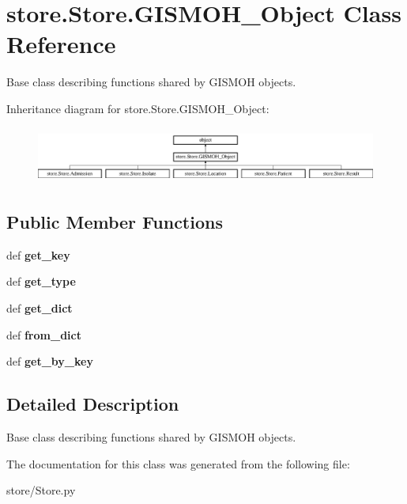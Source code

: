 \hypertarget{classstore_1_1_store_1_1_g_i_s_m_o_h___object}{\section{store.\-Store.\-G\-I\-S\-M\-O\-H\-\_\-\-Object Class Reference}
\label{classstore_1_1_store_1_1_g_i_s_m_o_h___object}
}


Base class describing functions shared by G\-I\-S\-M\-O\-H objects.  


Inheritance diagram for store.\-Store.\-G\-I\-S\-M\-O\-H\-\_\-\-Object\-:\begin{figure}[H]
\begin{center}
\leavevmode
\includegraphics[height=1.866667cm]{classstore_1_1_store_1_1_g_i_s_m_o_h___object}
\end{center}
\end{figure}
\subsection*{Public Member Functions}
\begin{DoxyCompactItemize}
\item 
\hypertarget{classstore_1_1_store_1_1_g_i_s_m_o_h___object_ac3391d8ff49f41c4d90d8692fcf9ee8e}{def {\bfseries get\-\_\-key}}\label{classstore_1_1_store_1_1_g_i_s_m_o_h___object_ac3391d8ff49f41c4d90d8692fcf9ee8e}

\item 
\hypertarget{classstore_1_1_store_1_1_g_i_s_m_o_h___object_ab955e952f3fad2c1cc1909cf79bbfd25}{def {\bfseries get\-\_\-type}}\label{classstore_1_1_store_1_1_g_i_s_m_o_h___object_ab955e952f3fad2c1cc1909cf79bbfd25}

\item 
\hypertarget{classstore_1_1_store_1_1_g_i_s_m_o_h___object_a9b9e18740c48aedb2751ffbe62ca5f50}{def {\bfseries get\-\_\-dict}}\label{classstore_1_1_store_1_1_g_i_s_m_o_h___object_a9b9e18740c48aedb2751ffbe62ca5f50}

\item 
\hypertarget{classstore_1_1_store_1_1_g_i_s_m_o_h___object_a2e3683c267f623cd7740c7f47da42880}{def {\bfseries from\-\_\-dict}}\label{classstore_1_1_store_1_1_g_i_s_m_o_h___object_a2e3683c267f623cd7740c7f47da42880}

\item 
\hypertarget{classstore_1_1_store_1_1_g_i_s_m_o_h___object_a539e1c749f7900003ac845ec1f40c13d}{def {\bfseries get\-\_\-by\-\_\-key}}\label{classstore_1_1_store_1_1_g_i_s_m_o_h___object_a539e1c749f7900003ac845ec1f40c13d}

\end{DoxyCompactItemize}


\subsection{Detailed Description}
Base class describing functions shared by G\-I\-S\-M\-O\-H objects. 

The documentation for this class was generated from the following file\-:\begin{DoxyCompactItemize}
\item 
store/Store.\-py\end{DoxyCompactItemize}
